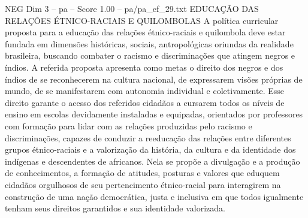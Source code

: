 \begin{textsample}{NEG Dim 3 – pa – Score 1.00 – pa/pa\_ef\_29.txt}  \label{ex:f3_neg_056}
EDUCAÇÃO DAS RELAÇÕES ÉTNICO-RACIAIS E QUILOMBOLAS A política curricular proposta para a educação das relações étnico-raciais e quilombola deve estar fundada em dimensões históricas, sociais, antropológicas oriundas da realidade brasileira, buscando combater o racismo e discriminações que atingem negros e índios.
A referida proposta apresenta como metas o direito dos negros e dos índios de se reconhecerem na cultura nacional, de expressarem visões próprias de mundo, de se manifestarem com autonomia individual e coletivamente.
Esse direito garante o acesso dos referidos cidadãos a cursarem todos os níveis de ensino em escolas devidamente instaladas e equipadas, orientados por professores com formação para lidar com as relações produzidas pelo racismo e discriminações, capazes de conduzir a reeducação das relações entre diferentes grupos étnico-raciais e a valorização da história, da cultura e da identidade dos indígenas e descendentes de africanos.
Nela se propõe a divulgação e a produção de conhecimentos, a formação de atitudes, posturas e valores que eduquem cidadãos orgulhosos de seu pertencimento étnico-racial para interagirem na construção de uma nação democrática, justa e inclusiva em que todos igualmente tenham seus direitos garantidos e sua identidade valorizada.

\end{textsample}

